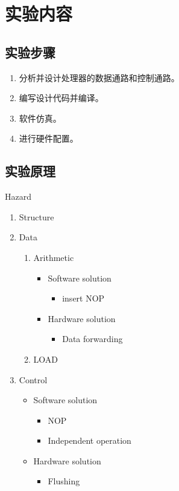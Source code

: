 \documentclass[10pt,a4paper,fleqn]{article}
\begin{document}
  \section{实验内容}
  \subsection*{实验步骤}
  \begin{enumerate}
    \item 分析并设计处理器的数据通路和控制通路。
    \item 编写设计代码并编译。
    \item 软件仿真。
    \item 进行硬件配置。
  \end{enumerate}

  \subsection*{实验原理}
  Hazard
  \begin{enumerate}
    \item Structure
    \item Data
    \begin{enumerate}
      \item Arithmetic
      \begin{itemize}
        \item Software solution
        \begin{itemize}
          \item insert NOP
        \end{itemize}
        \item Hardware solution
        \begin{itemize}
          \item Data forwarding
        \end{itemize}
      \end{itemize}
      \item LOAD
    \end{enumerate}
    \item Control
    \begin{itemize}
      \item Software solution
      \begin{itemize}
        \item NOP
        \item Independent operation
      \end{itemize}
      \item Hardware solution\begin{itemize}
        \item Flushing
      \end{itemize}
    \end{itemize}
  \end{enumerate}
\end{document}
